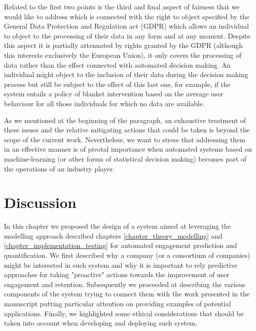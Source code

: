 Related to the first two points is the third and final aspect of fairness that we would like to address which is connected with the right to object specified by the General Data Protection and Regulation act (GDPR) \cite{EUdataregulations2018} which allows an individual to object to the processing of their data in any form and at any moment. Despite this aspect it is partially attenuated by rights granted by the GDPR (although this interests exclusively the European Union), it only covers the processing of data rather than the effect connected with automated decision making. An individual might object to the inclusion of their data during the decision making process but still be subject to the effect of this last one, for example, if the system entails a policy of blanket intervention based on the average user behaviour for all those individuals for which no data are available.

As we mentioned at the beginning of the paragraph, an exhaustive treatment of these issues and the relative mitigating actions that could be taken is beyond the scope of the current work. Nevertheless, we want to stress that addressing them in an effective manner is of pivotal importance when automated systems based on machine-learning (or other forms of statistical decision making) becomes part of the operations of an industry player.

\section{Discussion}
In this chapter we proposed the design of a system aimed at leveraging the modelling approach described chapters \ref{chapter_theory_modelling} and \ref{chapter_implementation_testing} for automated engagement prediction and quantification. We first described why a company (or a consortium of companies) might be interested in such system and why it is important to rely predictive approaches for taking "proactive" actions towards the improvement of user engagement and retention. Subsequently we proceeded at describing the various components of the system trying to connect them with the work presented in the manuscript putting particular attention on providing examples of potential applications. Finally, we highlighted some ethical considerations that should be taken into account when developing and deploying such system. 

